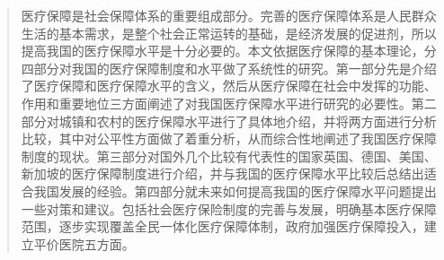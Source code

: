 

\begin{abstract}

医疗保障是社会保障体系的重要组成部分。完善的医疗保障体系是人民群众生活的基本需求，是整个社会正常运转的基础，是经济发展的促进剂，所以提高我国的医疗保障水平是十分必要的。本文依据医疗保障的基本理论，分四部分对我国的医疗保障制度和水平做了系统性的研究。第一部分先是介绍了医疗保障和医疗保障水平的含义，然后从医疗保障在社会中发挥的功能、作用和重要地位三方面阐述了对我国医疗保障水平进行研究的必要性。第二部分对城镇和农村的医疗保障水平进行了具体地介绍，并将两方面进行分析比较，其中对公平性方面做了着重分析，从而综合性地阐述了我国医疗保障制度的现状。第三部分对国外几个比较有代表性的国家英国、德国、美国、新加坡的医疗保障制度进行介绍，并与我国的医疗保障水平比较后总结出适合我国发展的经验。第四部分就未来如何提高我国的医疗保障水平问题提出一些对策和建议。包括社会医疗保险制度的完善与发展，明确基本医疗保障范围，逐步实现覆盖全民一体化医疗保障体制，政府加强医疗保障投入，建立平价医院五方面。


\end{abstract}
